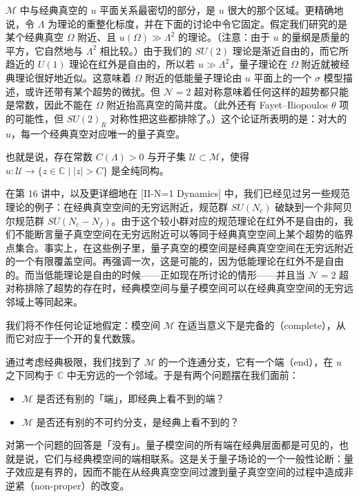$\mathcal{M}$ 中与经典真空的 $u$ 平面关系最密切的部分，是 $u$ 很大的那个区域。更精确地说，令 $\Lambda$ 为理论的重整化标度，并在下面的讨论中令它固定。假定我们研究的是某个经典真空 $\Omega$ 附近、且 $u(\Omega)\gg\Lambda^2$ 的理论。（注意：由于 $u$ 的量纲是质量的平方，它自然地与 $\Lambda^2$ 相比较。）由于我们的 $SU(2)$ 理论是渐近自由的，而它所趋近的 $U(1)$ 理论在红外是自由的，所以若 $u\gg\Lambda^2$，量子理论在 $\Omega$ 附近就被经典理论很好地近似。这意味着 $\Omega$ 附近的低能量子理论由 $u$ 平面上的一个 $\sigma$ 模型描述，或许还带有某个超势的微扰。但 $\mathcal{N}=2$ 超对称意味着任何这样的超势都只能是常数，因此不能在 $\Omega$ 附近抬高真空的简并度。（此外还有 Fayet--Iliopoulos $\theta$ 项的可能性，但 $SU(2)_R$ 对称性把这些都排除了。）这个论证所表明的是：对大的 $u$，每一个经典真空对应唯一的量子真空。

也就是说，存在常数 $C(\Lambda)>0$ 与开子集 $\mathcal{U}\subset\mathcal{M}$，使得 $u:\mathcal{U}\to\{z\in\mathbb{C}\mid |z|>C\}$ 是全纯同构。

在第 16 讲中，以及更详细地在 [II-N=1 Dynamics] 中，我们已经见过另一些规范理论的例子：在经典真空空间的无穷远附近，规范群 $SU(N_c)$ 破缺到一个非阿贝尔规范群 $SU(N_c-N_f)$。由于这个较小群对应的规范理论在红外不是自由的，我们不能断言量子真空空间在无穷远附近可以等同于经典真空空间上某个超势的临界点集合。事实上，在这些例子里，量子真空的模空间是经典真空空间在无穷远附近的一个有限覆盖空间。再强调一次，这是可能的，因为低能理论在红外不是自由的。而当低能理论是自由的时候——正如现在所讨论的情形——并且当 $\mathcal{N}=2$ 超对称排除了超势的存在时，经典模空间与量子模空间可以在经典真空空间的无穷远邻域上等同起来。

我们将不作任何论证地假定：模空间 $\mathcal{M}$ 在适当意义下是完备的（complete），从而它对应于一个开的复代数簇。

通过考虑经典极限，我们找到了 $\mathcal{M}$ 的一个连通分支，它有一个端（end），在 $u$ 之下同构于 $\mathbb{C}$ 中无穷远的一个邻域。于是有两个问题摆在我们面前：
\begin{itemize}
\item $\mathcal{M}$ 是否还有别的「端」，即经典上看不到的端？
\item $\mathcal{M}$ 是否还有别的不可约分支，是经典上看不到的？
\end{itemize}

对第一个问题的回答是「没有」。量子模空间的所有端在经典层面都是可见的，也就是说，它们与经典模空间的端相联系。这是关于量子场论的一个一般性论断：量子效应是有界的，因而不能在从经典真空空间过渡到量子真空空间的过程中造成非逆紧（non-proper）的改变。

